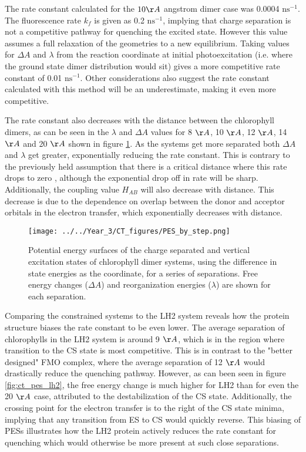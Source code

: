The rate constant calculated for the $10\AA{}$ angstrom dimer case was 0.0004 $\text{ns}^{-1}$.
The fluorescence rate $k_f$ is given as 0.2 $\text{ns}^{-1}$, implying that charge
separation is not a competitive pathway for quenching the excited state. However
this value assumes a full relaxation of the geometries to a new equilibrium. Taking
values for $\Delta A$ and $\lambda$ from the reaction coordinate at initial photoexcitation 
(i.e. where the ground state dimer distribution would sit) gives a more competitive 
rate constant of 0.01 $\text{ns}^{-1}$. Other considerations also suggest the rate
constant calculated with this method will be an underestimate, making it even more competitive.

The rate constant also decreases with the distance between the chlorophyll dimers, as can
be seen in the $\lambda$ and $\Delta A$ values for 8 $\AA{}$, 10 $\AA{}$, 12 $\AA{}$,
14 $\AA{}$ and 20 $\AA{}$ shown in figure \ref{fig:ct_pes_distance}. As the systems
get more separated both $\Delta A$ and $\lambda$ get greater, exponentially reducing 
the rate constant. This is contrary to the previously held assumption that there 
is a critical distance where this rate drops to zero \cite{Beddard1976}, although 
the exponential drop off in rate will be sharp. Additionally, the coupling value 
$H_{AB}$ will also decrease with distance. This decrease is due to the dependence 
on overlap between the donor and acceptor orbitals in the electron transfer, which 
exponentially decreases with distance.

\begin{figure}
    \centering
    \texttt{[image: ../../Year\_3/CT\_figures/PES\_by\_step.png]}
    \caption{Potential energy surfaces of the charge separated and vertical excitation
    states of chlorophyll dimer systems, using the difference in state energies 
    as the coordinate, for a series of separations. Free energy changes ($\Delta A$)
    and reorganization energies ($\lambda$) are shown for each separation.}
    \label{fig:ct_pes_distance}
\end{figure}

Comparing the constrained systems to the LH2 system reveals how the protein structure
biases the rate constant to be even lower. The average separation of chlorophylls
in the LH2 system is around 9 $\AA{}$, which is in the region where transition to
the CS state is most competitive. This is in contrast to the "better designed" FMO
complex, where the average separation of 12 $\AA{}$ would drastically reduce the
quenching pathway. However, as can been seen in figure \ref{fig:ct_pes_lh2}, the
free energy change is much higher for LH2 than for even the 20 $\AA{}$ case, attributed
to the destabilization of the CS state. Additionally, the crossing point for the
electron transfer is to the right of the CS state minima, implying that any transition
from ES to CS would quickly reverse. This biasing of PESs illustrates how the LH2
protein actively reduces the rate constant for quenching which would otherwise be 
more present at such close separations.

